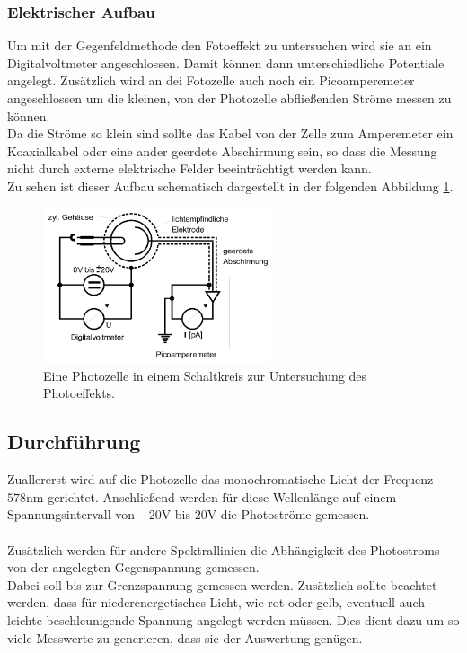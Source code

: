     \subsubsection{Elektrischer Aufbau }

    Um mit der Gegenfeldmethode den Fotoeffekt zu untersuchen wird sie an ein Digitalvoltmeter angeschlossen. 
    Damit können dann unterschiedliche Potentiale angelegt. 
    Zusätzlich wird an dei Fotozelle auch noch ein Picoamperemeter angeschlossen um die kleinen, von der Photozelle abfließenden Ströme messen zu können.\\
    Da die Ströme so klein sind sollte das Kabel von der Zelle zum Amperemeter ein Koaxialkabel oder eine ander geerdete Abschirmung sein, so dass die Messung nicht durch externe elektrische Felder beeinträchtigt werden kann.\\
    Zu sehen ist dieser Aufbau schematisch dargestellt in der folgenden Abbildung \ref{img:schem}.



    \begin{figure}[h]
        \centering
        \includegraphics[width=0.6\textwidth]{latex/images/Schaltbild.PNG}
        \caption{Eine Photozelle in einem Schaltkreis zur Untersuchung des Photoeffekts\protect \cite{500}.}
        \label{img:schem}
    \end{figure}


\subsection{Durchführung}

Zuallererst wird auf die Photozelle das monochromatische Licht der Frequenz $578 \si{\nano\metre}$ gerichtet. 
Anschließend werden für diese Wellenlänge auf einem Spannungsintervall von $-20 \si{\volt}$ bis $20 \si{\volt}$ die Photoströme gemessen.\\\\
Zusätzlich werden für andere Spektrallinien die Abhängigkeit des Photostroms von der angelegten Gegenspannung gemessen.\\
Dabei soll bis zur Grenzspannung gemessen werden. 
Zusätzlich sollte beachtet werden, dass für niederenergetisches Licht, wie rot oder gelb, eventuell auch leichte beschleunigende Spannung angelegt werden müssen.
Dies dient dazu um so viele Messwerte zu generieren, dass sie der Auswertung genügen.
